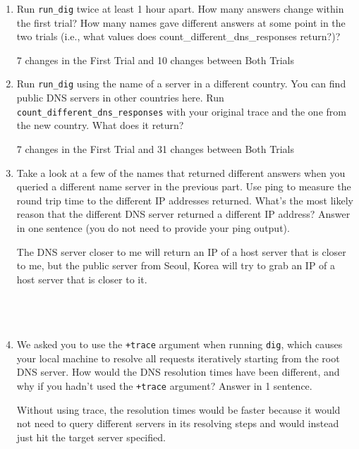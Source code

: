 \documentclass[10pt]{article}
\begin{document}
\begin{enumerate}
\item Run \texttt{run\_dig} twice at least 1 hour apart. How many answers change within the first trial? How many names gave different answers at some point in the two trials (i.e., what values does {count\_different\_dns\_responses} return?)?

7 changes in the First Trial and 10 changes between Both Trials

\item Run \texttt{run\_dig} using the name of a server in a different country. You can find public DNS servers in other countries here.
Run \texttt{count\_different\_dns\_responses} with your original trace and the one from the new country. What does it return?

7 changes in the First Trial and 31 changes between Both Trials

\item Take a look at a few of the names that returned different answers when you queried a different name server in the previous part. Use ping to measure the round trip time to the different IP addresses returned. What's the most likely reason that the different DNS server returned a different IP address? Answer in one sentence (you do not need to provide your ping output).

The DNS server closer to me will return an IP of a host server that is closer to me, but the public server from Seoul, Korea will try to grab an IP of a host server that is closer to it.
\\
\\
\\
\\
\item We asked you to use the \texttt{+trace} argument when running \texttt{dig}, which causes your local machine to resolve all requests iteratively starting from the root DNS server. How would the DNS resolution times have been different, and why if you hadn't used the \texttt{+trace} argument? Answer in 1 sentence.

Without using trace, the resolution times would be faster because it would not need to query different servers in its resolving steps and would instead just hit the target server specified.

\end{enumerate}
\end{document}
